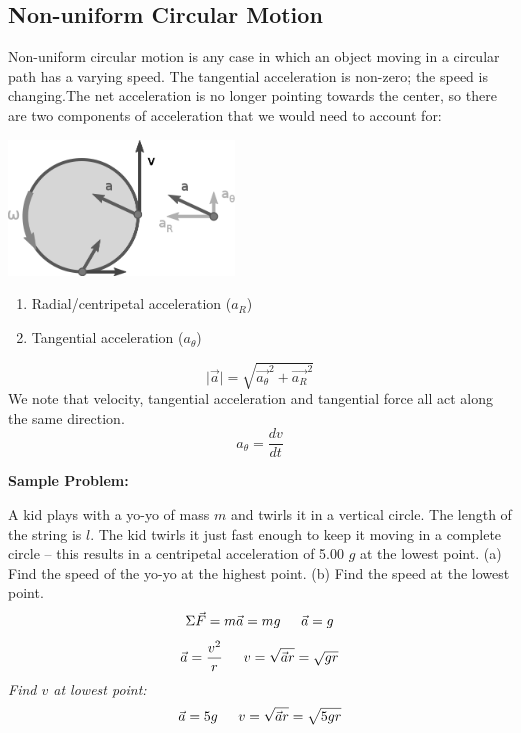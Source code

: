 \documentclass{article}
\begin{document}
  	\subsection{Non-uniform Circular Motion}
    	Non-uniform circular motion is any case in which an object moving in a circular path has a varying speed. The tangential acceleration is non-zero; the speed is changing.The net acceleration is no longer pointing towards the center, so there are two components of acceleration that we would need to account for:\vspace{1ex}
        \begin{multicols}{2}
            \centerline{\includegraphics[width=6cm]{noncirc.png}}
       	\columnbreak
        	\begin{enumerate}
        		\item Radial/centripetal acceleration ($a_R$)
            	\item Tangential acceleration ($a_\theta$)
        	\end{enumerate}
        	\[
            	\lvert\vec{a}\rvert=\sqrt{\vec{a_\theta}^2+\vec{a_R}^2}
            \]
            We note that velocity, tangential acceleration and tangential force all act along the same direction.
            \[
            	a_\theta=\frac{dv}{dt}
            \]
        \end{multicols}
        
        \noindent\textbf{Sample Problem:}
        \begin{multicols}{2}
        A kid plays with a yo-yo of mass $m$ and twirls it in a vertical circle.  The length of the string is $l$.  The kid twirls it just fast enough to keep it moving in a complete circle – this results in a centripetal acceleration of 5.00 $g$ at the lowest point. (a) Find the speed of the yo-yo at the highest point. (b) Find the speed at the lowest point.
        \vfill
        \columnbreak
        \[
        	\Sigma\vec{F}=m\vec{a}=mg \indent
            \vec{a}=g
        \]
        \[
        	\vec{a}=\frac{v^2}{r} \indent
            v=\sqrt{\vec{a}r}=\sqrt{gr}
        \]
        \textit{Find $v$ at lowest point:}
        \[
        	\vec{a}=5g \indent
            v=\sqrt{\vec{a}r}=\sqrt{5gr}
        \]        
        \end{multicols}
\end{document}
